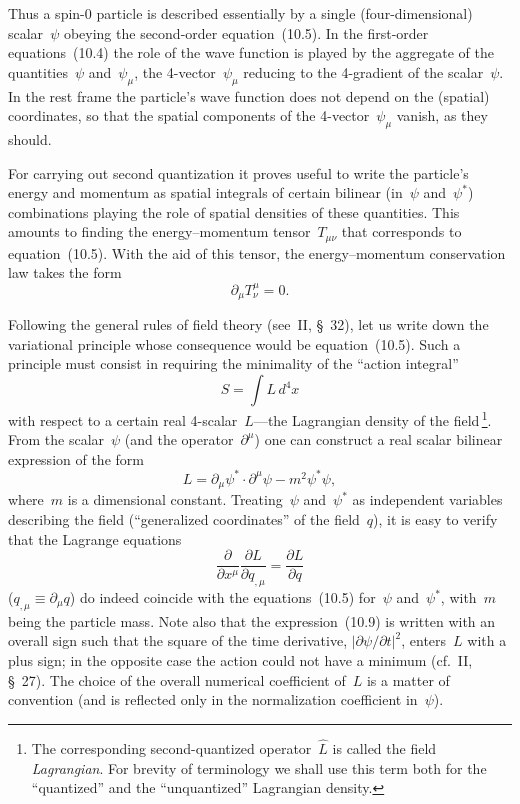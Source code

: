 Thus a spin-0 particle is described essentially by a single (four-dimensional) scalar~$\psi$ obeying the second-order equation~(10.5). In the first-order equations~(10.4) the role of the wave function is played by the aggregate of the quantities~$\psi$ and~$\psi_\mu$, the 4-vector~$\psi_\mu$ reducing to the 4-gradient of the scalar~$\psi$. In the rest frame the particle's wave function does not depend on the (spatial) coordinates, so that the spatial components of the 4-vector~$\psi_\mu$ vanish, as they should.

For carrying out second quantization it proves useful to write the particle's energy and momentum as spatial integrals of certain bilinear (in~$\psi$ and~$\psi^*$) combinations playing the role of spatial densities of these quantities. This amounts to finding the energy--momentum tensor~$T_{\mu\nu}$ that corresponds to equation~(10.5). With the aid of this tensor, the energy--momentum conservation law takes the form
\begin{equation}
\partial_\mu T^\mu_\nu = 0.
\tag{10.7}
\end{equation}

Following the general rules of field theory (see~II, \S~32), let us write down the variational principle whose consequence would be equation~(10.5). Such a principle must consist in requiring the minimality of the ``action integral''
\begin{equation}
S = \int L\,d^4x
\tag{10.8}
\end{equation}
with respect to a certain real 4-scalar~$L$---the Lagrangian density of the field\,\footnote{The corresponding second-quantized operator~$\hat{L}$ is called the field \emph{Lagrangian}. For brevity of terminology we shall use this term both for the ``quantized'' and the ``unquantized'' Lagrangian density.}. From the scalar~$\psi$ (and the operator~$\partial^\mu$) one can construct a real scalar bilinear expression of the form
\begin{equation}
L = \partial_\mu\psi^* \cdot \partial^\mu\psi - m^2\psi^*\psi,
\tag{10.9}
\end{equation}
where~$m$ is a dimensional constant. Treating~$\psi$ and~$\psi^*$ as independent variables describing the field (``generalized coordinates'' of the field~$q$), it is easy to verify that the Lagrange equations
\begin{equation}
\frac{\partial}{\partial x^\mu}\frac{\partial L}{\partial q_{,\mu}} = \frac{\partial L}{\partial q}
\tag{10.10}
\end{equation}
($q_{,\mu} \equiv \partial_\mu q$) do indeed coincide with the equations~(10.5) for~$\psi$ and~$\psi^*$, with~$m$ being the particle mass. Note also that the expression~(10.9) is written with an overall sign such that the square of the
time derivative, $|\partial\psi/\partial t|^2$, enters~$L$ with a plus sign; in the opposite case the action could not have a minimum (cf.~II, \S~27). The choice of the overall numerical coefficient of~$L$ is a matter of convention (and is reflected only in the normalization coefficient in~$\psi$).

